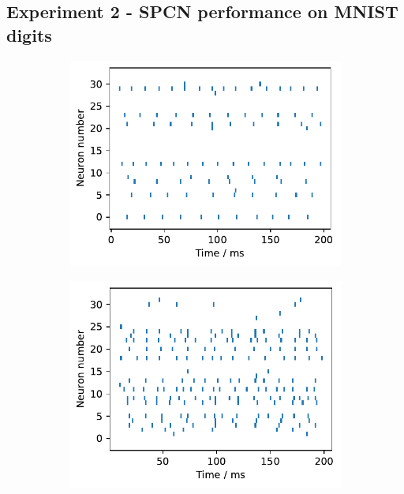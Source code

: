 \documentclass[a4paper,11pt]{article} %
\begin{document}
\subsection{Experiment 2 - SPCN performance on MNIST digits}
\begin{figure}[ht]
  \begin{subfigure}[t]{0.32\columnwidth}
    \includegraphics[width=\linewidth]{graphics/spikes_0.pdf}  
  \end{subfigure}
  \hfill
  \begin{subfigure}[t]{0.32\columnwidth}
    \includegraphics[width=\linewidth]{graphics/spikes_1.pdf}  
  \end{subfigure}
  \hfill
  \begin{subfigure}[t]{0.32\columnwidth}

\end{subfigure}
\end{figure}
\end{document}
